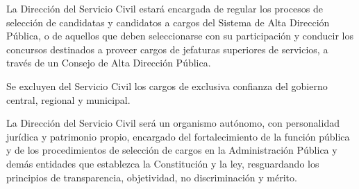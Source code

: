 \documentclass[11pt, a4paper]{article}
\begin{document}
\begin{enumerate}
La Dirección del Servicio Civil estará encargada de regular los procesos de selección de candidatas y candidatos a cargos del Sistema de Alta Dirección Pública, o de aquellos que deben seleccionarse con su participación y conducir los concursos destinados a proveer cargos de jefaturas superiores de servicios, a través de un Consejo de Alta Dirección Pública. 

Se excluyen del Servicio Civil los cargos de exclusiva confianza del gobierno central, regional y municipal. 

La Dirección del Servicio Civil será un organismo autónomo, con personalidad jurídica y patrimonio propio, encargado del fortalecimiento de la función pública y de los procedimientos de selección de cargos en la Administración Pública y demás entidades que establezca la Constitución y la ley, resguardando los principios de transparencia, objetividad, no discriminación y mérito. 


\end{enumerate}
\end{document}

